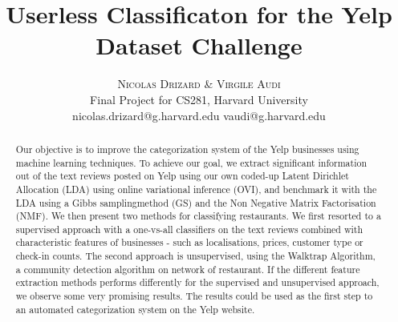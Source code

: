 \documentclass[twoside]{article}
\title{\vspace{-15mm}\fontsize{24pt}{10pt}\selectfont\textbf{Userless Classificaton for the Yelp Dataset Challenge}} %
\author{
\large
\textsc{Nicolas Drizard \& Virgile Audi}\\[2mm] %
\normalsize Final Project for CS281, Harvard University \\ %
\normalsize {nicolas.drizard@g.harvard.edu \quad vaudi@g.harvard.edu} %
\vspace{-5mm}
}
\date{}
\begin{document}
\maketitle %

\thispagestyle{fancy} %


\begin{abstract}

\noindent

Our objective is to improve the categorization system of the Yelp businesses using machine learning techniques. To achieve our goal, we extract significant information out of the text reviews posted on Yelp using our own coded-up Latent Dirichlet Allocation (LDA) using online variational inference (OVI), and benchmark it with the LDA using a Gibbs samplingmethod (GS) and the Non Negative Matrix Factorisation (NMF). We then present two methods for classifying restaurants. We first resorted to a supervised approach with a one-vs-all classifiers on  the text reviews combined with characteristic features of businesses - such as localisations, prices, customer type or check-in counts. The second approach is unsupervised, using the Walktrap Algorithm, a community detection algorithm on network of restaurant. If the different feature extraction methods performs differently for the supervised and unsupervised approach, we observe some very promising results. The results could be used as the first step to an automated categorization system on the Yelp website. 

\end{abstract}

\end{document}

